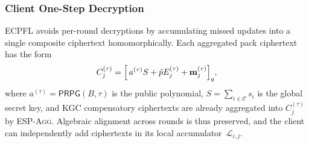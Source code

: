 \documentclass[10pt,conference]{IEEEtran}
\begin{document}
\begin{algorithm}[t]
\caption{\textsc{ECP} Download Module}
\label{alg:download}
\small
{}




\end{algorithm}

\subsubsection{Client One-Step Decryption}
\label{sssec:prefetch-decrypt}

\textsc{ECPFL} avoids per-round decryptions by accumulating missed updates into a single composite ciphertext homomorphically.
Each aggregated pack ciphertext has the form
\begin{equation}
C_j^{(\tau)} = \Bigl[\, a^{(\tau)} S + \tilde{p} E_j^{(\tau)} + \mathbf{m}_j^{(\tau)} \Bigr]_{q},
\label{eq:pack-ciphertext}
\end{equation}
where $a^{(\tau)} = \mathsf{PRPG}(B, \tau)$ is the public polynomial, $S = \sum_{i \in \mathcal{C}} s_i$ is the global secret key, and KGC compensatory ciphertexts are already aggregated into $C_j^{(\tau)}$ by \textsc{ESP-Agg}.
Algebraic alignment across rounds is thus preserved, and the client can independently add ciphertexts in its local accumulator~$\mathcal{L}_{i,j}$.
\end{document}

